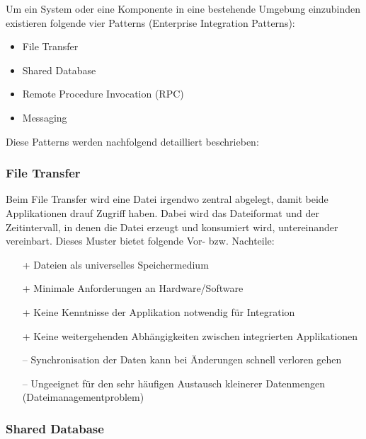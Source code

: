 Um ein System oder eine Komponente in eine bestehende Umgebung einzubinden existieren folgende vier Patterns (Enterprise Integration Patterns):
\begin{itemize}
	\item File Transfer
	\item Shared Database
	\item Remote Procedure Invocation (RPC)
	\item Messaging
\end{itemize}
Diese Patterns werden nachfolgend detailliert beschrieben:

\subsubsection{File Transfer}

Beim File Transfer wird eine Datei irgendwo zentral abgelegt, damit beide Applikationen drauf Zugriff haben. Dabei wird das Dateiformat und der Zeitintervall, in denen die Datei erzeugt und konsumiert wird, untereinander vereinbart. Dieses Muster bietet folgende Vor- bzw. Nachteile:
\begin{itemize}
	\item[+] Dateien als universelles Speichermedium
	\item[+] Minimale Anforderungen an Hardware/Software
	\item[+] Keine Kenntnisse der Applikation notwendig für Integration
	\item[+] Keine weitergehenden Abhängigkeiten zwischen integrierten Applikationen	
	\item[--] Synchronisation der Daten kann bei Änderungen schnell verloren gehen	
	\item[--] Ungeeignet für den sehr häufigen Austausch kleinerer Datenmengen (Dateimanagementproblem)
\end{itemize}

\subsubsection{Shared Database}

